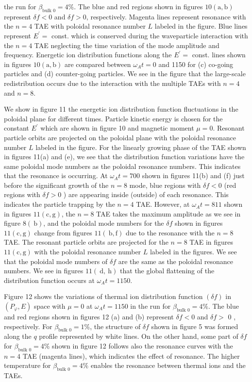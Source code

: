 \documentclass[10pt]{article}
\begin{document}
the run for $\beta_{\text {bulk } 0}=4 \%$. The blue and red regions shown in figures $10(\mathrm{a}, \mathrm{b})$ represent $\delta f<0$ and $\delta f>0$, respectively. Magenta lines represent resonance with the $n=4$ TAE with poloidal resonance number $L$ labeled in the figure. Blue lines represent $E^{\prime}=$ const. which is conserved during the waveparticle interaction with the $n=4$ TAE neglecting the time variation of the mode amplitude and frequency. Energetic ion distribution functions along the $E^{\prime}=$ const. lines shown in figures $10(\mathrm{a}, \mathrm{b})$ are compared between $\omega_{A} t=0$ and 1150 for (c) co-going particles and (d) counter-going particles. We see in the figure that the large-scale redistribution occurs due to the interaction with the multiple TAEs with $n=4$ and $n=8$.

We show in figure 11 the energetic ion distribution function fluctuations in the poloidal plane for different times. Particle kinetic energy is chosen for the constant $E^{\prime}$ which are shown in figure 10 and magnetic moment $\mu=0$. Resonant particle orbits are projected on the poloidal plane with the poloidal resonance number $L$ labeled in the figure. For the linearly growing phase of the TAE shown in figures 11(a) and (e), we see that the distribution function variations have the same poloidal mode numbers as the poloidal resonance numbers. This indicates that the resonance is occurring. At $\omega_{A} t=700$ shown in figures 11(b) and (f) just before the significant growth of the $n=8$ mode, blue regions with $\delta f<0$ (red regions with $\delta f>0$ ) are appearing inside (outside) of each resonance. This indicates the particle trapping by the $n=4$ TAE. However, at $\omega_{A} t=811$ shown in figures $11(\mathrm{c}, \mathrm{g})$, the $n=8$ TAE takes the maximum amplitude as we see in figure $8(\mathrm{~b})$, and the poloidal mode numbers for the $\delta f$ shown in figures $11(\mathrm{c}, \mathrm{g})$ change from figures $11(\mathrm{~b}, \mathrm{f})$ due to the resonance with the $n=8$ TAE. The resonant particle orbits are projected for the $n=8$ TAE in figures $11(\mathrm{c}, \mathrm{g})$ with the poloidal resonance number $L$ labeled in the figures. We see that the poloidal mode numbers of $\delta f$ are the same as the poloidal resonance numbers. We see in figures $11(\mathrm{~d}, \mathrm{~h})$ that the global flattening of the distribution function occurs at $\omega_{A} t=1150$.

Figure 12 shows the variations of thermal ion distribution function $(\delta f)$ in $\left(P_{\varphi}, E\right)$ space with $\mu=0$ at $\omega_{A} t=1150$ in the run for $\beta_{\text {bulk } 0}=4 \%$. The blue and red regions shown in figures 12 (a) and (b) represent $\delta f<0$ and $\delta f>$ 0 , respectively. For $\beta_{\text {bulk } 0}=1 \%$, the structure of $\delta f$ shown in figure 5 was formed along the $q$ profile represented by white lines. On the other hand, some part of $\delta f$ for $\beta_{\text {bulk } 0}=4 \%$ shown in figure 12 follows also the resonance curves with the $n=4$ TAE (magenta lines), which indicates the effect of resonance. The higher temperature for $\beta_{\text {bulk } 0}=4 \%$ enables the resonance between thermal ions and the TAEs.
\end{document}
